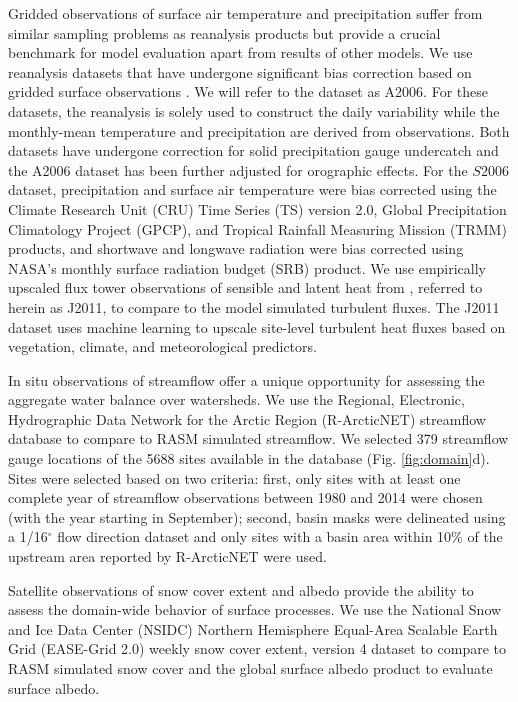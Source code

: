 Gridded observations of surface air temperature and precipitation suffer from similar sampling problems as reanalysis products but provide a crucial benchmark for model evaluation apart from results of other models.
We use reanalysis datasets that have undergone significant bias correction based on gridded surface observations \citep{Adam_2006,Sheffield_2006}.
We will refer to the \citet{Adam_2006} dataset as A2006.
For these datasets, the reanalysis is solely used to construct the daily variability while the monthly-mean temperature and precipitation are derived from observations.
Both datasets have undergone correction for solid precipitation gauge undercatch and the A2006 dataset has been further adjusted for orographic effects.
For the $S2006$ dataset, precipitation and surface air temperature were bias corrected using the Climate Research Unit (CRU) Time Series (TS) version 2.0, Global Precipitation Climatology Project (GPCP), and Tropical Rainfall Measuring Mission (TRMM) products, and shortwave and longwave radiation were bias corrected using NASA's monthly surface radiation budget (SRB) product.
We use empirically upscaled flux tower observations of sensible and latent heat from \citet{Jung_2011}, referred to herein as J2011, to compare to the model simulated turbulent fluxes.
The J2011 dataset uses machine learning to upscale site-level turbulent heat fluxes based on vegetation, climate, and meteorological predictors.

In situ observations of streamflow offer a unique opportunity for assessing the aggregate water balance over watersheds.
We use the Regional, Electronic, Hydrographic Data Network for the Arctic Region (R-ArcticNET) streamflow database \citep{Lammers_2001} to compare to RASM simulated streamflow.
We selected 379 streamflow gauge locations of the 5688 sites available in the database (Fig. \ref{fig:domain}d).
Sites were selected based on two criteria: first, only sites with at least one complete year of streamflow observations between 1980 and 2014 were chosen (with the year starting in September); second, basin masks were delineated using a 1/16$^{\circ}$ flow direction dataset \citep{Wu_2011} and only sites with a basin area within 10\% of the upstream area reported by R-ArcticNET were used.

Satellite observations of snow cover extent and albedo provide the ability to assess the domain-wide behavior of surface processes.
We use the National Snow and Ice Data Center (NSIDC) Northern Hemisphere Equal-Area Scalable Earth Grid (EASE-Grid 2.0) weekly snow cover extent, version 4 dataset \citep{Brodzik_2013} to compare to RASM simulated snow cover and the global surface albedo product \citep[GlobAlbedo; ][]{Muller_2012} to evaluate surface albedo.

